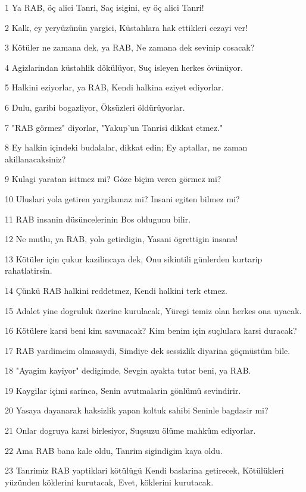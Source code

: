 \par 1 Ya RAB, öç alici Tanri, Saç isigini, ey öç alici Tanri!
\par 2 Kalk, ey yeryüzünün yargici, Küstahlara hak ettikleri cezayi ver!
\par 3 Kötüler ne zamana dek, ya RAB, Ne zamana dek sevinip cosacak?
\par 4 Agizlarindan küstahlik dökülüyor, Suç isleyen herkes övünüyor.
\par 5 Halkini eziyorlar, ya RAB, Kendi halkina eziyet ediyorlar.
\par 6 Dulu, garibi bogazliyor, Öksüzleri öldürüyorlar.
\par 7 "RAB görmez" diyorlar, "Yakup'un Tanrisi dikkat etmez."
\par 8 Ey halkin içindeki budalalar, dikkat edin; Ey aptallar, ne zaman akillanacaksiniz?
\par 9 Kulagi yaratan isitmez mi? Göze biçim veren görmez mi?
\par 10 Uluslari yola getiren yargilamaz mi? Insani egiten bilmez mi?
\par 11 RAB insanin düsüncelerinin Bos oldugunu bilir.
\par 12 Ne mutlu, ya RAB, yola getirdigin, Yasani ögrettigin insana!
\par 13 Kötüler için çukur kazilincaya dek, Onu sikintili günlerden kurtarip rahatlatirsin.
\par 14 Çünkü RAB halkini reddetmez, Kendi halkini terk etmez.
\par 15 Adalet yine dogruluk üzerine kurulacak, Yüregi temiz olan herkes ona uyacak.
\par 16 Kötülere karsi beni kim savunacak? Kim benim için suçlulara karsi duracak?
\par 17 RAB yardimcim olmasaydi, Simdiye dek sessizlik diyarina göçmüstüm bile.
\par 18 "Ayagim kayiyor" dedigimde, Sevgin ayakta tutar beni, ya RAB.
\par 19 Kaygilar içimi sarinca, Senin avutmalarin gönlümü sevindirir.
\par 20 Yasaya dayanarak haksizlik yapan koltuk sahibi Seninle bagdasir mi?
\par 21 Onlar dogruya karsi birlesiyor, Suçsuzu ölüme mahkûm ediyorlar.
\par 22 Ama RAB bana kale oldu, Tanrim sigindigim kaya oldu.
\par 23 Tanrimiz RAB yaptiklari kötülügü Kendi baslarina getirecek, Kötülükleri yüzünden köklerini kurutacak, Evet, köklerini kurutacak.


